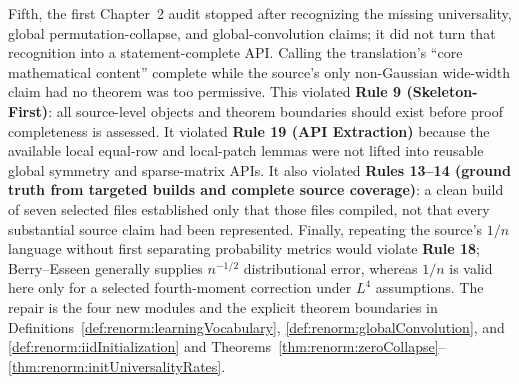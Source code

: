 Fifth, the first Chapter~2 audit stopped after recognizing the missing universality, global
permutation-collapse, and global-convolution claims; it did not turn that recognition into a
statement-complete API.  Calling the translation's ``core mathematical content'' complete while
the source's only non-Gaussian wide-width claim had no theorem was too permissive.  This violated
\textbf{Rule 9 (Skeleton-First)}: all source-level objects and theorem boundaries should exist
before proof completeness is assessed.  It violated \textbf{Rule 19 (API Extraction)} because the
available local equal-row and local-patch lemmas were not lifted into reusable global symmetry and
sparse-matrix APIs.  It also violated \textbf{Rules 13--14 (ground truth from targeted builds and
complete source coverage)}: a clean build of seven selected files established only that those files
compiled, not that every substantial source claim had been represented.  Finally, repeating the
source's $1/n$ language without first separating probability metrics would violate
\textbf{Rule 18}; Berry--Esseen generally supplies $n^{-1/2}$ distributional error, whereas $1/n$
is valid here only for a selected fourth-moment correction under $L^4$ assumptions.  The repair is
the four new modules and the explicit theorem boundaries in
Definitions~\ref{def:renorm:learningVocabulary}, \ref{def:renorm:globalConvolution}, and
\ref{def:renorm:iidInitialization} and Theorems~\ref{thm:renorm:zeroCollapse}--
\ref{thm:renorm:initUniversalityRates}.

